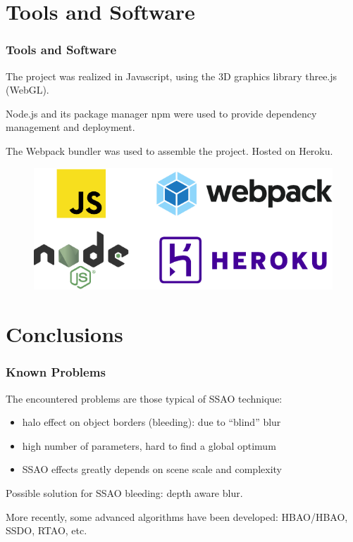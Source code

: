 \documentclass{beamer}
\newcommand{\textplus}{\raisebox{.1\height}{\scalebox{.9}{\texttt{+}}}}
\begin{document}
\section{Tools and Software}
\begin{frame}
\frametitle{Tools and Software}
The project was realized in Javascript, using the 3D graphics library three.js (WebGL).

Node.js and its package manager npm were used to provide dependency management and deployment.

The Webpack bundler was used to assemble the project. Hosted on Heroku.
\begin{figure}
    \centering
    \includegraphics[width=0.6\linewidth]{images/software_logos.pdf}
\end{figure}


\end{frame}

\section{Conclusions}

\begin{frame}
\frametitle{Known Problems}
The encountered problems are those typical of SSAO technique:
\begin{itemize}
    \item halo effect on object borders (bleeding): due to ``blind'' blur
    \item high number of parameters, hard to find a global optimum
    \item SSAO effects greatly depends on scene scale and complexity
\end{itemize}

Possible solution for SSAO bleeding: depth aware blur.

More recently, some advanced algorithms have been developed: HBAO/HBAO\textplus, SSDO, RTAO, etc.
\end{frame}
\end{document}
